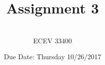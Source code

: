 \documentclass{article}
\begin{document}

\title{Assignment 3} %
\author{ \\ECEV 33400} %
\date{Due Date: Thursday 10/26/2017} %

\maketitle

%
%


\end{document}
